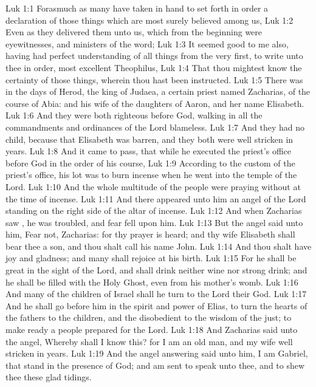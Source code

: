 \vs Luk 1:1 Forasmuch as many have taken in hand to set forth in order a declaration of those things which are most surely believed among us,
\vs Luk 1:2 Even as they delivered them unto us, which from the beginning were eyewitnesses, and ministers of the word;
\vs Luk 1:3 It seemed good to me also, having had perfect understanding of all things from the very first, to write unto thee in order, most excellent Theophilus,
\vs Luk 1:4 That thou mightest know the certainty of those things, wherein thou hast been instructed.
\vs Luk 1:5 There was in the days of Herod, the king of Judaea, a certain priest named Zacharias, of the course of Abia: and his wife  of the daughters of Aaron, and her name  Elisabeth.
\vs Luk 1:6 And they were both righteous before God, walking in all the commandments and ordinances of the Lord blameless.
\vs Luk 1:7 And they had no child, because that Elisabeth was barren, and they both were  well stricken in years.
\vs Luk 1:8 And it came to pass, that while he executed the priest's office before God in the order of his course,
\vs Luk 1:9 According to the custom of the priest's office, his lot was to burn incense when he went into the temple of the Lord.
\vs Luk 1:10 And the whole multitude of the people were praying without at the time of incense.
\vs Luk 1:11 And there appeared unto him an angel of the Lord standing on the right side of the altar of incense.
\vs Luk 1:12 And when Zacharias saw , he was troubled, and fear fell upon him.
\vs Luk 1:13 But the angel said unto him, Fear not, Zacharias: for thy prayer is heard; and thy wife Elisabeth shall bear thee a son, and thou shalt call his name John.
\vs Luk 1:14 And thou shalt have joy and gladness; and many shall rejoice at his birth.
\vs Luk 1:15 For he shall be great in the sight of the Lord, and shall drink neither wine nor strong drink; and he shall be filled with the Holy Ghost, even from his mother's womb.
\vs Luk 1:16 And many of the children of Israel shall he turn to the Lord their God.
\vs Luk 1:17 And he shall go before him in the spirit and power of Elias, to turn the hearts of the fathers to the children, and the disobedient to the wisdom of the just; to make ready a people prepared for the Lord.
\vs Luk 1:18 And Zacharias said unto the angel, Whereby shall I know this? for I am an old man, and my wife well stricken in years.
\vs Luk 1:19 And the angel answering said unto him, I am Gabriel, that stand in the presence of God; and am sent to speak unto thee, and to shew thee these glad tidings.
